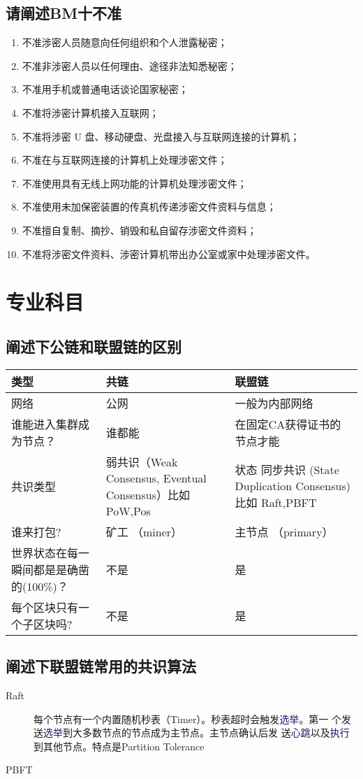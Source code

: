 \documentclass[dvipsnames]{ctexart}
\newcommand{\mycola}{MidnightBlue}
\newcommand{\cola}[1]{\textcolor{\mycola}{#1}}
\begin{document}
\subsection*{请阐述BM十不准}
\begin{enumerate}
\item 不准涉密人员随意向任何组织和个人泄露秘密；
\item 不准非涉密人员以任何理由、途径非法知悉秘密；
\item 不准用手机或普通电话谈论国家秘密；
\item 不准将涉密计算机接入互联网；
\item 不准将涉密 U 盘、移动硬盘、光盘接入与互联网连接的计算机；
\item 不准在与互联网连接的计算机上处理涉密文件；
\item 不准使用具有无线上网功能的计算机处理涉密文件；
\item 不准使用未加保密装置的传真机传递涉密文件资料与信息；
\item 不准擅自复制、摘抄、销毁和私自留存涉密文件资料；
\item 不准将涉密文件资料、涉密计算机带出办公室或家中处理涉密文件。
\end{enumerate}

\section*{专业科目}
\subsection*{阐述下公链和联盟链的区别}
\begin{center}
  \begin{tabularx}{0.8\textwidth} { 
       >{\raggedright\arraybackslash}X 
       >{\centering\arraybackslash}X 
       >{\raggedleft\arraybackslash}X  }
     \toprule
     \textbf{类型} & \textbf{共链} & \textbf{联盟链} \\
     \midrule
     网络  & 公网  & 一般为内部网络  \\
     \hline
     谁能进入集群成为节点？  & 谁都能  & 在固定CA获得证书的节点才能  \\
     \hline
     共识类型 & 弱共识（Weak Consensus, Eventual Consensus）比如 PoW,Pos & 状态
     同步共识 (State Duplication Consensus) 比如 Raft,PBFT\\
     \hline
     谁来打包? & 矿工 （miner） & 主节点 （primary）\\
     \hline
     世界状态在每一瞬间都是是确凿的(100\%)？ & 不是 & 是\\
     \hline
     每个区块只有一个子区块吗? &不是&是\\
     \bottomrule
\end{tabularx}
\end{center}

\subsection*{阐述下联盟链常用的共识算法}

\begin{description}
\item[Raft] 每个节点有一个内置随机秒表（Timer）。秒表超时会触发\cola{选举}。第一
  个发送\cola{选举}到大多数节点的节点成为主节点。主节点确认后发
  送\cola{心跳}以及\cola{执行}到其他节点。特点是Partition Tolerance
\item[PBFT] 
\end{description}
\end{document}
